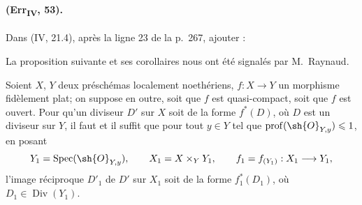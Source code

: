 \paragraph{(Err\textsubscript{IV}, 53).}
Dans (IV, 21.4), après la ligne 23 de la p.~267, ajouter :

La proposition suivante et ses corollaires nous ont été signalés par
M.~Raynaud.

\begin{proposition}[21.4.9]
\label{IV.21.4.9}
Soient $X$, $Y$ deux préschémas localement noethériens,
$f:X\to Y$ un morphisme fidèlement plat; on suppose en outre, soit que
$f$ est quasi-compact, soit que $f$ est ouvert. Pour qu'un diviseur
$D'$ sur $X$ soit de la forme $f^*(D)$, où $D$ est un diviseur sur
$Y$, il faut et il suffit que pour tout $y\in Y$ tel que
$\operatorname{prof}(\sh{O}_{Y,y})\leq1$, en posant
\[
 Y_1=\operatorname{Spec}(\sh{O}_{Y,y}),\qquad
 X_1=X\times_YY_1,\qquad
 f_1=f_{(Y_1)}:X_1\to Y_1,
\]
l'image réciproque $D'_1$ de $D'$ sur $X_1$ soit de la forme
$f_1^*(D_1)$, où $D_1\in\operatorname{Div}(Y_1)$.
\end{proposition}

